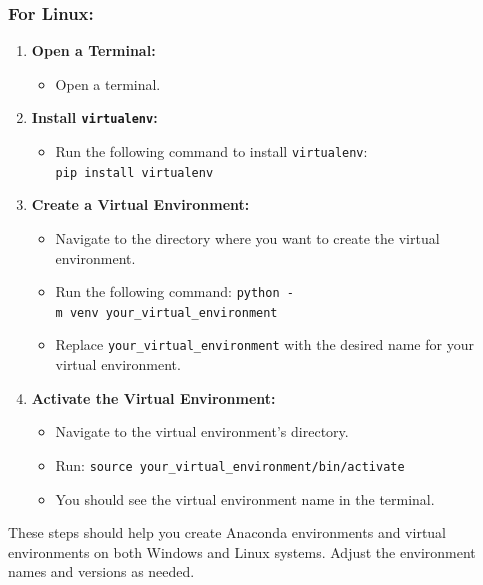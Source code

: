 \documentclass[
  letterpaper,
  DIV=11,
  numbers=noendperiod]{scrreprt}
\providecommand{\tightlist}{%
  \setlength{\itemsep}{0pt}\setlength{\parskip}{0pt}}\usepackage{longtable,booktabs,array}
\begin{document}
\subsubsection{For Linux:}\label{for-linux-1}

\begin{enumerate}
\def\labelenumi{\arabic{enumi}.}
\tightlist
\item
  \textbf{Open a Terminal:}

  \begin{itemize}
  \tightlist
  \item
    Open a terminal.
  \end{itemize}
\item
  \textbf{Install \texttt{virtualenv}:}

  \begin{itemize}
  \tightlist
  \item
    Run the following command to install \texttt{virtualenv}:
    \texttt{pip\ install\ virtualenv}
  \end{itemize}
\item
  \textbf{Create a Virtual Environment:}

  \begin{itemize}
  \tightlist
  \item
    Navigate to the directory where you want to create the virtual
    environment.
  \item
    Run the following command:
    \texttt{python\ -m\ venv\ your\_virtual\_environment}
  \item
    Replace \texttt{your\_virtual\_environment} with the desired name
    for your virtual environment.
  \end{itemize}
\item
  \textbf{Activate the Virtual Environment:}

  \begin{itemize}
  \tightlist
  \item
    Navigate to the virtual environment's directory.
  \item
    Run: \texttt{source\ your\_virtual\_environment/bin/activate}
  \item
    You should see the virtual environment name in the terminal.
  \end{itemize}
\end{enumerate}

These steps should help you create Anaconda environments and virtual
environments on both Windows and Linux systems. Adjust the environment
names and versions as needed.
\end{document}

